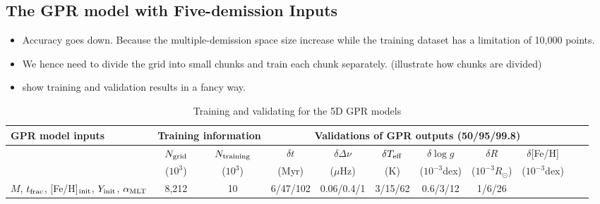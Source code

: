 \subsection{The GPR model with Five-demission Inputs}

\begin{itemize}
\item Accuracy goes down. Because the multiple-demission space size increase while the training dataset has a limitation of 10,000 points.  
\item We hence need to divide the grid into small chunks and train each chunk separately.  (illustrate how chunks are divided)
\item  show training and validation results in a fancy way. 
\end{itemize}


\begin{table}
	\centering
	\caption{Training and validating for the 5D GPR models}
	\label{tab:gpdetails}
	\begin{tabular}{lcc|cccccccc} %
		\hline
		 GPR model inputs &\multicolumn{2}{c}{Training information} & \multicolumn{6}{c}{Validations of GPR outputs (50/95/99.8)}\\ %
		 \hline
		& $N_{\rm grid}$&$N_{\rm training}$&$\delta t$&$\delta \Delta\nu$& $\delta T_{\rm eff}$ & $\delta \log g$ & $\delta R$ & $\delta$[Fe/H]\\
		  & ($10^3$)& ($10^3$)& (Myr)&($\mu$Hz)&(K)&($10^{-3}$dex)&($10^{-3}R_{\odot}$)&($10^{-3}$dex)\\
		 \hline
		$M$, $t_{\rm frac}$, [Fe/H]$_{\rm init}$, $Y_{\rm init}$, $\alpha_{\rm MLT}$& 8,212 & 10 & 6/47/102& 0.06/0.4/1& 3/15/62&0.6/3/12&1/6/26&\\
       \hline
	\end{tabular}
\end{table}








